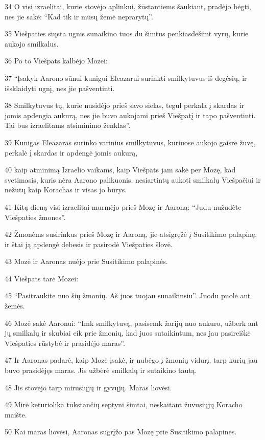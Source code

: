 \par 34 O visi izraelitai, kurie stovėjo aplinkui, žūstantiems šaukiant, pradėjo bėgti, nes jie sakė: “Kad tik ir mūsų žemė neprarytų”. 
\par 35 Viešpaties siųsta ugnis sunaikino tuos du šimtus penkiasdešimt vyrų, kurie aukojo smilkalus. 
\par 36 Po to Viešpats kalbėjo Mozei: 
\par 37 “Įsakyk Aarono sūnui kunigui Eleazarui surinkti smilkytuvus iš degėsių, ir išsklaidyti ugnį, nes jie pašventinti. 
\par 38 Smilkytuvus tų, kurie nusidėjo prieš savo sielas, tegul perkala į skardas ir jomis apdengia aukurą, nes jie buvo aukojami prieš Viešpatį ir tapo pašventinti. Tai bus izraelitams atsiminimo ženklas”. 
\par 39 Kunigas Eleazaras surinko varinius smilkytuvus, kuriuose aukojo gaisre žuvę, perkalė į skardas ir apdengė jomis aukurą, 
\par 40 kaip atminimą Izraelio vaikams, kaip Viešpats jam sakė per Mozę, kad svetimasis, kuris nėra Aarono palikuonis, nesiartintų aukoti smilkalų Viešpačiui ir nežūtų kaip Korachas ir visas jo būrys. 
\par 41 Kitą dieną visi izraelitai murmėjo prieš Mozę ir Aaroną: “Judu nužudėte Viešpaties žmones”. 
\par 42 Žmonėms susirinkus prieš Mozę ir Aaroną, jie atsigręžė į Susitikimo palapinę, ir štai ją apdengė debesis ir pasirodė Viešpaties šlovė. 
\par 43 Mozė ir Aaronas nuėjo prie Susitikimo palapinės. 
\par 44 Viešpats tarė Mozei: 
\par 45 “Pasitraukite nuo šių žmonių. Aš juos tuojau sunaikinsiu”. Juodu puolė ant žemės. 
\par 46 Mozė sakė Aaronui: “Imk smilkytuvą, pasisemk žarijų nuo aukuro, užberk ant jų smilkalų ir skubiai eik prie žmonių, kad juos sutaikintum, nes jau pasireiškė Viešpaties rūstybė ir prasidėjo maras”. 
\par 47 Ir Aaronas padarė, kaip Mozė įsakė, ir nubėgo į žmonių vidurį, tarp kurių jau buvo prasidėjęs maras. Jis užbėrė smilkalų ir sutaikino tautą. 
\par 48 Jis stovėjo tarp mirusiųjų ir gyvųjų. Maras liovėsi. 
\par 49 Mirė keturiolika tūkstančių septyni šimtai, neskaitant žuvusiųjų Koracho maište. 
\par 50 Kai maras liovėsi, Aaronas sugrįžo pas Mozę prie Susitikimo palapinės.



